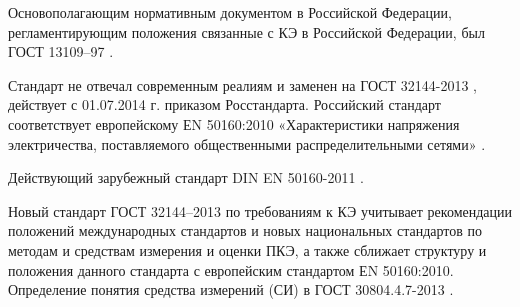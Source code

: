 Основополагающим нормативным документом в Российской Федерации, регламентирующим положения связанные с КЭ в Российской Федерации, был ГОСТ 13109–97 \cite{ГОСТ13109-97}. 

Стандарт не отвечал современным реалиям и заменен на ГОСТ 32144-2013 \cite{ГОСТ32144-2013}, действует с 01.07.2014 г. приказом Росстандарта. Российский стандарт соответствует европейскому ЕN 50160:2010 «Характеристики напряжения электричества, поставляемого общественными распределительными сетями» \cite{ЕN50160:2010}. 

Действующий зарубежный стандарт DIN EN 50160-2011 \cite{DINEN50160-2011}.

Новый стандарт ГОСТ 32144–2013 по требованиям к КЭ учитывает рекомендации положений международных стандартов и новых национальных стандартов по методам и средствам измерения и оценки ПКЭ, а также сближает структуру и положения данного стандарта с европейским стандартом ЕN 50160:2010.
Определение понятия средства измерений (СИ) в ГОСТ 30804.4.7-2013 \cite{ГОСТ30804.4.7-2013}.

